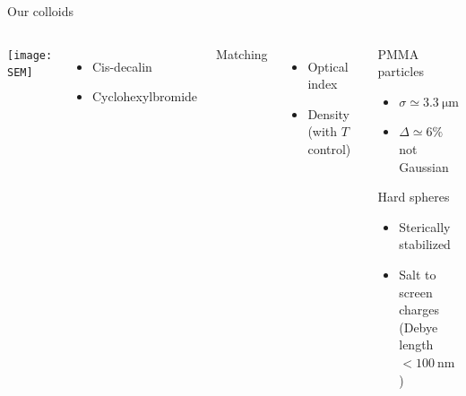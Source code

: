 \begin{frame}{Our colloids}
	\begin{columns}
	\begin{center}
	\texttt{[image: SEM]}
	\end{center}
	\begin{itemize}
		\item Cis-decalin
		\item Cyclohexylbromide
	\end{itemize}
	Matching
	\begin{itemize}
		\item Optical index
		\item Density (with $T$ control)
	\end{itemize}
	\begin{block}{PMMA particles}
		\begin{itemize}
			\item $\sigma \simeq \SI{3.3}{\micro\metre}$
			\item $\Delta \simeq 6\%$ not Gaussian
		\end{itemize}
		Hard spheres
		\begin{itemize}
			\item Sterically stabilized
			\item Salt to screen charges\\ (Debye length $<\SI{100}{\nano\metre}$)
		\end{itemize}
	\end{block}
	\end{columns}
\end{frame}

